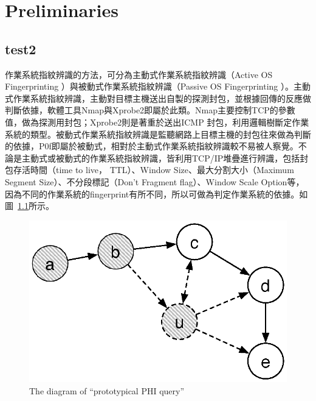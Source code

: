 \renewcommand\thefigure{\arabic{chapter}-\arabic{figure}} 

\chapter{Preliminaries}
\label{cha:preliminaries} 

\section{test2}
\label{sec:test2}

作業系統指紋辨識的方法，可分為主動式作業系統指紋辨識（Active OS Fingerprinting ）與被動式作業系統指紋辨識（Passive OS Fingerprinting ）。主動式作業系統指紋辨識，主動對目標主機送出自製的探測封包，並根據回傳的反應做判斷依據，軟體工具Nmap與Xprobe2即屬於此類。Nmap主要控制TCP的參數值，做為探測用封包；Xprobe2則是著重於送出ICMP 封包，利用邏輯樹斷定作業系統的類型。被動式作業系統指紋辨識是監聽網路上目標主機的封包往來做為判斷的依據，P0f即屬於被動式，相對於主動式作業系統指紋辨識較不易被人察覺。不論是主動式或被動式的作業系統指紋辨識，皆利用TCP/IP堆疊進行辨識，包括封包存活時間（time to live， TTL）、Window Size、最大分割大小（Maximum Segment Size）、不分段標記（Don't Fragment flag）、Window Scale Option等，因為不同的作業系統的fingerprint有所不同，所以可做為判定作業系統的依據。如圖~\ref{fig:PHI}所示。


\begin{figure}[H]
  \begin{center}
    \includegraphics[width=1.0\textwidth]{figures/dyna_rm.eps}
    \caption{The diagram of ``prototypical PHI query''} 
    \label{fig:PHI}
  \end{center}
\end{figure}